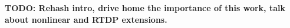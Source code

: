 {\bf TODO: Rehash intro, drive home the importance of this work,
talk about nonlinear and RTDP extensions.}
